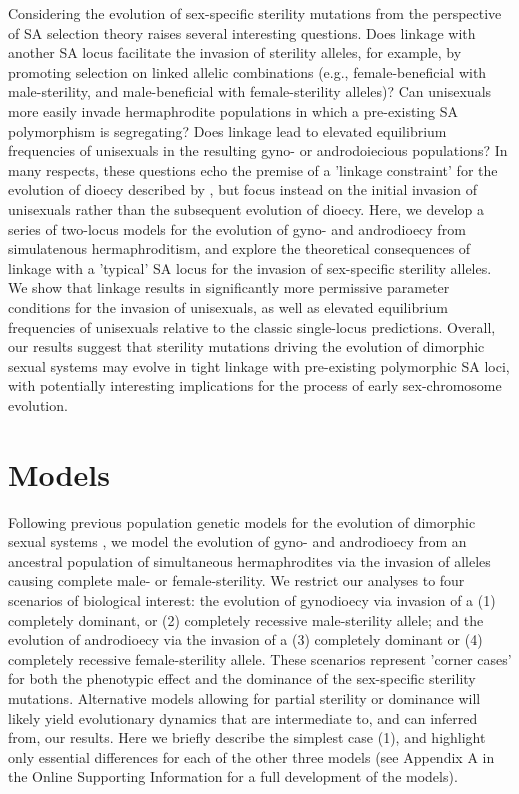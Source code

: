 \documentclass[9pt,twocolumn,twoside,lineno]{gsajnl}
\begin{document}
Considering the evolution of sex-specific sterility mutations from the perspective of SA selection theory raises several interesting questions. Does linkage with another SA locus facilitate the invasion of sterility alleles, for example, by promoting selection on linked allelic combinations (e.g., female-beneficial with male-sterility, and male-beneficial with female-sterility alleles)? Can unisexuals more easily invade hermaphrodite populations in which a pre-existing SA polymorphism is segregating? Does linkage lead to elevated equilibrium frequencies of unisexuals in the resulting gyno- or androdoiecious populations? In many respects, these questions echo the premise of a 'linkage constraint' for the evolution of dioecy described by \citet{Charlesworth1978a}, but focus instead on the initial invasion of unisexuals rather than the subsequent evolution of dioecy. Here, we develop a series of two-locus models for the evolution of gyno- and androdioecy from simulatenous hermaphroditism, and explore the theoretical consequences of linkage with a 'typical' SA locus for the invasion of sex-specific sterility alleles. We show that linkage results in significantly more permissive parameter conditions for the invasion of unisexuals, as well as elevated equilibrium frequencies of unisexuals relative to the classic single-locus predictions. Overall, our results suggest that sterility mutations driving the evolution of dimorphic sexual systems may evolve in tight linkage with pre-existing polymorphic SA loci, with potentially interesting implications for the process of early sex-chromosome evolution.


\section{Models}
\label{sec:methods}

Following previous population genetic models for the evolution of dimorphic sexual systems \citep{Charlesworth1978a}, we model the evolution of gyno- and androdioecy from an ancestral population of simultaneous hermaphrodites via the invasion of alleles causing complete male- or female-sterility. We restrict our analyses to four scenarios of biological interest: the evolution of gynodioecy via invasion of a (1) completely dominant, or (2) completely recessive male-sterility allele; and the evolution of androdioecy via the invasion of a (3) completely dominant or (4) completely recessive female-sterility allele. These scenarios represent 'corner cases' for both the phenotypic effect and the dominance of the sex-specific sterility mutations. Alternative models allowing for partial sterility or dominance will likely yield evolutionary dynamics that are intermediate to, and can inferred from, our results. Here we briefly describe the simplest case (1), and highlight only essential differences for each of the other three models (see Appendix A in the Online Supporting Information for a full development of the models). 
\end{document}
